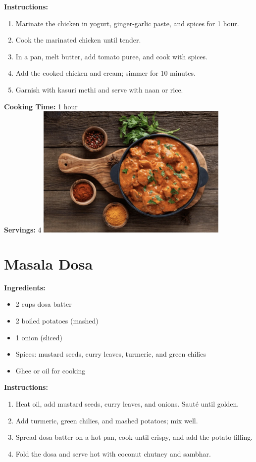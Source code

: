 \documentclass[12pt]{article}
\begin{document}
\textbf{Instructions:}
\begin{enumerate}
    \item Marinate the chicken in yogurt, ginger-garlic paste, and spices for 1 hour.
    \item Cook the marinated chicken until tender.
    \item In a pan, melt butter, add tomato puree, and cook with spices.
    \item Add the cooked chicken and cream; simmer for 10 minutes.
    \item Garnish with kasuri methi and serve with naan or rice.
\end{enumerate}

\textbf{Cooking Time:} 1 hour \\
\textbf{Servings:} 4
\includegraphics[width=0.7\textwidth]{butter_chicken.png} 
\newpage

\section*{Masala Dosa}
\textbf{Ingredients:}
\begin{itemize}
    \item 2 cups dosa batter
    \item 2 boiled potatoes (mashed)
    \item 1 onion (sliced)
    \item Spices: mustard seeds, curry leaves, turmeric, and green chilies
    \item Ghee or oil for cooking
\end{itemize}

\textbf{Instructions:}
\begin{enumerate}
    \item Heat oil, add mustard seeds, curry leaves, and onions. Sauté until golden.
    \item Add turmeric, green chilies, and mashed potatoes; mix well.
    \item Spread dosa batter on a hot pan, cook until crispy, and add the potato filling.
    \item Fold the dosa and serve hot with coconut chutney and sambhar.
\end{enumerate}
\end{document}
